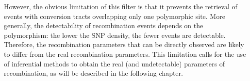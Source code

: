 
However, the obvious limitation of this filter is that it prevents the retrieval of events with conversion tracts overlapping only one polymorphic site.
More generally, the detectability of recombination events depends on the polymorphism: the lower the SNP density, the fewer events are detectable.
Therefore, the recombination parameters that can be directly observed are likely to differ from the real recombination parameters.
This limitation calls for the use of inferential methods to obtain the real (and undetectable) parameters of recombination, as will be described in the following chapter.










%




